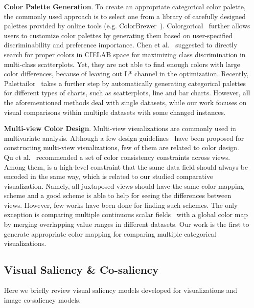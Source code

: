 \vspace{1.5mm}
\noindent\textbf{Color Palette Generation}.
To create an appropriate categorical color palette, the commonly used approach is to select one from a library of carefully designed palettes provided by online tools (e.g. ColorBrewer~\cite{harrower2003colorbrewer}).
Colorgorical~\cite{Gramazio17} further allows users to customize color palettes by generating them based on user-specified discriminability and preference importance.
Chen et al.~\cite{Chen14}  suggested to directly search for proper colors in CIELAB space for maximizing class discrimination in multi-class scatterplots. Yet, they are not able to find enough colors with large color differences, because of leaving out L* channel in the optimization. 
Recently, Palettailor~\cite{Lu21} takes a further step by automatically generating categorical palettes for different types of charts, such as scatterplots, line and bar charts.
However, all the aforementioned methods deal with single datasets, while our work focuses on visual comparisons within multiple 
datasets with some changed instances.

\vspace{1.5mm}
\noindent\textbf{Multi-view Color Design}.
Multi-view visualizations are commonly used in multivariate analysis. Although a few design guidelines~\cite{wang2000guidelines} have been proposed for constructing multi-view visualizations, few of them are related to color design. Qu et al.~\cite{qu2017keeping} recommended a set of color consistency constraints across views.
Among them, is a high-level constraint that the same data field should always be encoded in the same way, which is related to our studied comparative visualization. Namely, all juxtaposed views should have the same color mapping scheme and a good scheme is able to help for seeing the differences between views.
However, few works have been done for finding such schemes. The only exception is comparing multiple continuous scalar fields~\cite{Tominski08} with a global color map by merging overlapping value ranges in different datasets. Our work is the first to generate appropriate color mapping for comparing multiple categorical visualizations.

\subsection{Visual Saliency \& Co-saliency}
Here we briefly review visual saliency models developed for visualizations and image co-saliency models.

